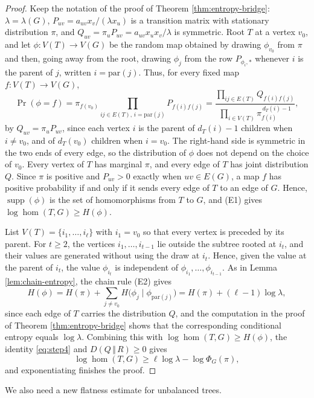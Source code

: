 \documentclass[11pt, a4paper]{article}
\theoremstyle{definition}
\theoremstyle{plain}
\renewcommand{\ge}{\geqslant}
\newcommand{\supp}{\operatorname{supp}}
\newcommand{\PhiG}{\Phi_G}
\begin{document}
\begin{proof}
Keep the notation of the proof of Theorem \ref{thm:entropy-bridge}: $\lambda =\lambda (G)$, $P_{uv}=a_{uv}x_v/(\lambda x_u)$ is a transition matrix with stationary distribution $\pi$, and $Q_{uv}=\pi_uP_{uv}=a_{uv}x_ux_v/\lambda$ is symmetric.
Root $T$ at a vertex $v_0$, and let $\phi: V(T)\to V(G)$ be the random map obtained by drawing $\phi_{v_0}$ from $\pi$ and then, going away from the root, drawing $\phi_j$ from the row $P_{\phi_i, *}$ whenever $i$ is the parent of $j$, written $i=\mathrm{par}(j)$. Thus, for every fixed map $f\colon V(T)\to V(G)$,
\[  \Pr (\phi =f) =\pi_{f(v_0)}\!\!\!
\prod_{{ij\in E(T),\, i=\mathrm{par}(j)}}\!\!\! P_{f(i)f(j)}
=\frac{\prod_{ij\in E(T)}Q_{f(i)f(j)}}{\prod_{i\in V(T)}\pi_{f(i)}^{\,d_T(i)-1}}, \]
by $Q_{uv}=\pi_uP_{uv}$, since each vertex $i$ is the parent of
$d_T(i)-1$ children when $i\ne v_0$, and of $d_T(v_0)$ children
when $i=v_0$. The right-hand side is symmetric in the two ends of every edge, so the distribution of $\phi$ does not depend on the choice of $v_0$. Every vertex of $T$ has marginal $\pi$, and every edge of $T$ has joint distribution $Q$.
Since $\pi$ is positive and $P_{uv}>0$ exactly when $uv\in E(G)$, a map $f$ has positive probability if
and only if it sends every edge of $T$ to an edge of
$G$. Hence, $\supp (\phi)$ is the set of homomorphisms
from $T$ to $G$, and (E1) gives
$\log \hom (T,G)\ge H(\phi)$.


List $V(T)=\{i_1,\ldots ,i_\ell\}$ with $i_1=v_0$ so
that every vertex is preceded by its parent. For
$t\ge 2$, the vertices $i_1,\ldots ,i_{t-1}$ lie
outside the subtree rooted at $i_t$, and their values
are generated without using the draw at $i_t$. Hence,
given the value at the parent of $i_t$, the value
$\phi_{i_t}$ is independent of
$\phi_{i_1},\ldots ,\phi_{i_{t-1}}$. 
As in Lemma \ref{lem:chain-entropy}, 
the chain rule (E2) gives
\[
  H(\phi)=H(\pi)+\sum_{j\ne v_0}
    H\bigl(\phi_j\mid \phi_{\mathrm{par}(j)}\bigr)
  =H(\pi)+(\ell -1)\log \lambda ,
\]
since each edge of $T$ carries the distribution $Q$, and the
computation in the proof of Theorem 
\ref{thm:entropy-bridge} shows that the corresponding
conditional entropy equals $\log \lambda$. 
Combining
this with $\log \hom (T,G)\ge H(\phi)$, the identity
\eqref{eq:step4} and $D(Q\, \Vert \, R)\ge 0$ gives
\[
  \log \hom (T,G)\ge \ell \log \lambda
    -\log \PhiG(\pi),
\]
and exponentiating finishes the proof.
\end{proof}

We also need a new flatness estimate for unbalanced trees. 
\end{document}
